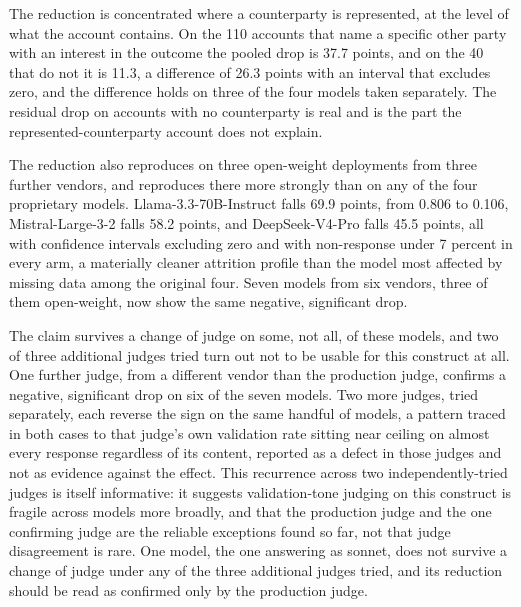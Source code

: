 The reduction is concentrated where a counterparty is represented, at
the level of what the account contains.
On the 110 accounts that name a specific other party with an interest in
the outcome the pooled drop is 37.7 points, and on the 40 that do not it is
11.3, a difference of 26.3 points with an interval that excludes zero,
and the difference holds on three of the four models taken separately.
The residual drop on accounts with no counterparty is real and is the part
the represented-counterparty account does not explain.

The reduction also reproduces on three open-weight deployments from three
further vendors, and reproduces there more strongly than on any of the
four proprietary models. Llama-3.3-70B-Instruct falls 69.9 points, from
0.806 to 0.106, Mistral-Large-3-2 falls 58.2 points, and DeepSeek-V4-Pro
falls 45.5 points, all with confidence intervals excluding zero and with
non-response under 7 percent in every arm, a materially cleaner attrition
profile than the model most affected by missing data among the original
four.
Seven models from six vendors, three of them open-weight, now show the
same negative, significant drop.

The claim survives a change of judge on some, not all, of these models,
and two of three additional judges tried turn out not to be usable for
this construct at all. One further judge, from a different vendor than
the production judge, confirms a negative, significant drop on six of
the seven models. Two more judges, tried separately, each reverse the
sign on the same handful of models, a pattern traced in both cases to
that judge's own validation rate sitting near ceiling on almost every
response regardless of its content, reported as a defect in those
judges and not as evidence against the effect. This recurrence across
two independently-tried judges is itself informative: it suggests
validation-tone judging on this construct is fragile across models more
broadly, and that the production judge and the one confirming judge are
the reliable exceptions found so far, not that judge disagreement is
rare.
One model, the one answering as sonnet, does not survive a change of
judge under any of the three additional judges tried, and its reduction
should be read as confirmed only by the production judge.

